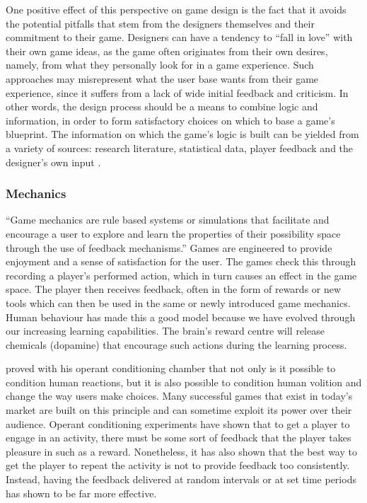 \documentclass[final]{cmpreport}
\begin{document}
One positive effect of this perspective on game design is the fact that it avoids the potential pitfalls that stem from the designers themselves and their commitment to their game. Designers can have a tendency to ``fall in love'' with their own game ideas, as the game often originates from their own desires, namely, from what they personally look for in a game experience. Such approaches may misrepresent what the user base wants from their game experience, since it suffers from a lack of wide initial feedback and criticism. In other words, the design process should be a means to combine logic and information, in order to form satisfactory choices on which to base a game's blueprint. The information on which the game's logic is built can be yielded from a variety of sources: research literature, statistical data, player feedback and the designer's own input \cite{ErmiMayra}.

\subsubsection{Mechanics}
``Game mechanics are rule based systems or simulations that facilitate and encourage a user to explore and learn the properties of their possibility space through the use of feedback mechanisms.''\cite{Koster} Games are engineered to provide enjoyment and a sense of satisfaction for the user. The games check this through recording a player's performed action, which in turn causes an effect in the game space. The player then receives feedback, often in the form of rewards or new tools which can then be used in the same or newly introduced game mechanics. Human behaviour has made this a good model because we have evolved through our increasing learning capabilities. The brain's reward centre will release chemicals (dopamine) that encourage such actions during the learning process.

\cite{Skinner} proved with his operant conditioning chamber that not only is it possible to condition human reactions, but it is also possible to condition human volition and change the way users make choices. Many successful games that exist in today's market are built on this principle and can sometime exploit its power over their audience. Operant conditioning experiments have shown that to get a player to engage in an activity, there must be some sort of feedback that the player takes pleasure in such as a reward. Nonetheless, it has also shown that the best way to get the player to repeat the activity is not to provide feedback too consistently. Instead, having the feedback delivered at random intervals or at set time periods has shown to be far more effective.
\end{document}
